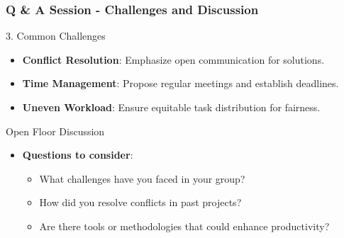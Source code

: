 \documentclass[aspectratio=169]{beamer}
\begin{document}
\begin{frame}[fragile]
    \frametitle{Q \& A Session - Challenges and Discussion}
    \begin{block}{3. Common Challenges}
        \begin{itemize}
            \item \textbf{Conflict Resolution}: Emphasize open communication for solutions.
            \item \textbf{Time Management}: Propose regular meetings and establish deadlines.
            \item \textbf{Uneven Workload}: Ensure equitable task distribution for fairness.
        \end{itemize}
    \end{block}

    \begin{block}{Open Floor Discussion}
        \begin{itemize}
            \item \textbf{Questions to consider}:
            \begin{itemize}
                \item What challenges have you faced in your group?
                \item How did you resolve conflicts in past projects?
                \item Are there tools or methodologies that could enhance productivity?
            \end{itemize}
        \end{itemize}
    \end{block}
\end{frame}
\end{document}
